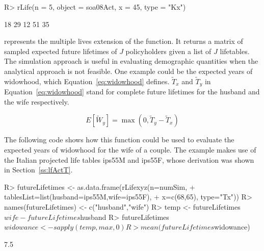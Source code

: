 \documentclass[nojss]{jss}
\begin{document}
\begin{Schunk}
\begin{Sinput}
R> rLife(n = 5, object = soa08Act, x = 45, type = "Kx")
\end{Sinput}
\begin{Soutput}
[1] 18 29 12 51 35
\end{Soutput}
\end{Schunk}

 represents the multiple lives extension of the 
function. It returns a matrix of sampled expected future lifetimes of $J$
policyholders given a list of $J$ lifetables. The simulation approach is
useful in evaluating demographic quantities when the analytical approach is
not feasible.
One example could be the expected years of widowhood, which
Equation~\ref{eq:widowhood} defines. $\tilde T_x$ and $\tilde T_y$ in
Equation~\ref{eq:widowhood} stand for complete future lifetimes for 
the husband and the wife respectively.

\begin{equation}
E\left[ \tilde W_y \right] = \max \left( 0, \tilde T_y - \tilde T_x \right)
\label{eq:widowhood}
\end{equation}

The following code shows how this function could be used to 
evaluate the expected years of widowhood for the wife of a couple. The
example makes use of the Italian projected life tables ips55M and ips55F, whose
derivation was shown in Section~\ref{ss:lfActT}.


\begin{Schunk}
\begin{Sinput}
R> futureLifetimes <- as.data.frame(rLifexyz(n=numSim, 
+  				tablesList=list(husband=ips55M,wife=ips55F),
+  				x=c(68,65), type="Tx"))
R> names(futureLifetimes) <- c("husband","wife")
R> temp <- futureLifetimes$wife - futureLifetimes$husband
R> futureLifetimes$widowance  <-  sapply(temp, max,0)
R> mean(futureLifetimes$widowance)
\end{Sinput}
\begin{Soutput}
[1] 7.5
\end{Soutput}
\end{Schunk}
\end{document}
